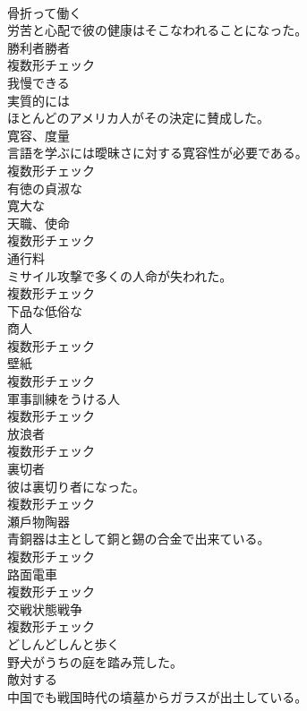 \documentclass[8pt]{extreport}
\begin{document}
\begin{CJK}{UTF8}{min}
\\	[動詞]	骨折って働く	
\\	労苦と心配で彼の健康はそこなわれることになった。	
\\	[名詞]	勝利者勝者	
\\	複数形チェック
\\	[形容詞]	我慢できる	
\\	[副詞]	実質的には	
\\	ほとんどのアメリカ人がその決定に賛成した。	
\\	[名詞]	寛容、度量	
\\	言語を学ぶには曖昧さに対する寛容性が必要である。	
\\	複数形チェック
\\	[形容詞]	有徳の貞淑な	
\\	[形容詞]	寛大な	
\\	[名詞]	天職、使命	
\\	複数形チェック
\\	[名詞]	通行料	
\\	ミサイル攻撃で多くの人命が失われた。	
\\	複数形チェック
\\	[形容詞]	下品な低俗な	
\\	[名詞]	商人	
\\	複数形チェック
\\	[名詞]	壁紙	
\\	複数形チェック
\\	[名詞]	軍事訓練をうける人	
\\	複数形チェック
\\	[名詞]	放浪者	
\\	複数形チェック
\\	[名詞]	裏切者	
\\	彼は裏切り者になった。	
\\	複数形チェック
\\	[名詞]	瀬戶物陶器	
\\	青銅器は主として銅と錫の合金で出来ている。	
\\	複数形チェック
\\	[名詞]	路面電車	
\\	複数形チェック
\\	[名詞]	交戦状態戦争	
\\	複数形チェック
\\	[動詞]	どしんどしんと歩く	
\\	野犬がうちの庭を踏み荒した。	
\\	[形容詞]	敵対する	
\\	中国でも戦国時代の墳墓からガラスが出土している。	

\end{CJK}
\end{document}

